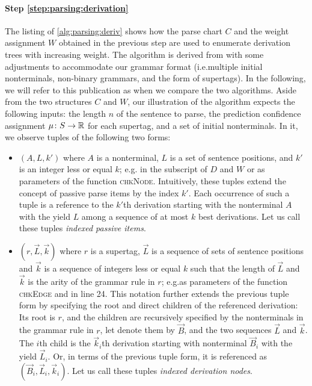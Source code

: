 \documentclass[../../document.tex]{subfiles}
\begin{document}
    \paragraph{Step \ref{step:parsing:derivation}}
    The listing of \cref{alg:parsing:deriv} shows how the parse chart \(C\) and the weight assignment \(W\) obtained in the previous step are used to enumerate derivation trees with increasing weight.
    The algorithm is derived from \citet[Algorithm 2, 3 and 4]{HuaChia05} with some adjustments to accommodate our grammar format (i.e.\@ multiple initial nonterminals, non-binary grammars, and the form of  supertags).
    In the following, we will refer to this publication as  when we compare the two algorithms.
    Aside from the two structures \(C\) and \(W\), our illustration of the algorithm expects the following inputs: the length \(n\) of the sentence to parse, the prediction confidence assignment \(\mu\colon S \to \mathbb{R}\) for each supertag, and a set of initial nonterminals.
    In it, we observe tuples of the following two forms:
    \begin{itemize}
        \item
            \((A, L, k')\) where \(A\) is a nonterminal, \(L\) is a set of sentence positions, and \(k'\) is an integer less or equal \(k\); e.g. in the subscript of \(D\) and \(W\) or as parameters of the function \textsc{chkNode}.
            Intuitively, these tuples extend the concept of passive parse items by the index \(k'\).
            Each occurrence of such a tuple is a reference to the \(k'\)th derivation starting with the nonterminal \(A\) with the yield \(L\) among a sequence of at most \(k\) best derivations.
            Let us call these tuples \emph{indexed passive items}.
        \item
            \((r, \vec{L}, \vec{k})\) where \(r\) is a supertag, \(\vec{L}\) is a sequence of sets of sentence positions and \(\vec{k}\) is a sequence of integers less or equal \(k\) such that the length of \(\vec{L}\) and \(\vec{k}\) is the arity of the grammar rule in \(r\); e.g.\@ as parameters of the function \textsc{chkEdge} and in line 24.
            This notation further extends the previous tuple form by specifying the root and direct children of the referenced derivation:
                Its root is \(r\), and the children are recursively specified by the  nonterminals in the grammar rule in \(r\), let denote them by \(\vec{B}\), and the two sequences \(\vec{L}\) and \(\vec{k}\).
                The \(i\)th child is the \(\vec{k}_i\)th derivation starting with nonterminal \(\vec{B}_i\) with the yield \(\vec{L}_i\).
                Or, in terms of the previous tuple form, it is referenced as \((\vec{B}_i, \vec{L}_i, \vec{k}_i)\).
            Let us call these tuples \emph{indexed derivation nodes}.
    \end{itemize}
\end{document}

